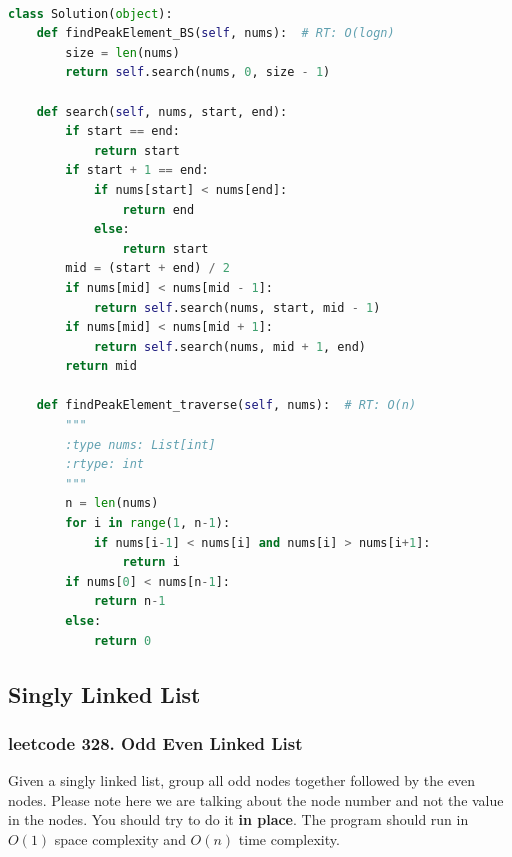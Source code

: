 \documentclass[a4paper,10pt]{article}
\begin{document}
\begin{lstlisting}[language=Python, caption=Problem162. Find Peak Element]

class Solution(object):
    def findPeakElement_BS(self, nums):  # RT: O(logn)
        size = len(nums)
        return self.search(nums, 0, size - 1)

    def search(self, nums, start, end):
        if start == end:
            return start
        if start + 1 == end:
            if nums[start] < nums[end]:
                return end
            else:
                return start
        mid = (start + end) / 2
        if nums[mid] < nums[mid - 1]:
            return self.search(nums, start, mid - 1)
        if nums[mid] < nums[mid + 1]:
            return self.search(nums, mid + 1, end)
        return mid

    def findPeakElement_traverse(self, nums):  # RT: O(n)
        """
        :type nums: List[int]
        :rtype: int
        """
        n = len(nums)
        for i in range(1, n-1):
            if nums[i-1] < nums[i] and nums[i] > nums[i+1]:
                return i
        if nums[0] < nums[n-1]:
            return n-1
        else:
            return 0
\end{lstlisting}































\subsection{Singly Linked List}

\subsubsection{leetcode 328. Odd Even Linked List}
Given a singly linked list, group all odd nodes together followed by the even nodes. Please note here we are talking about the node number and not the value in the nodes. You should try to do it \textbf{in place}. The program should run in $O(1)$ space complexity and $O(n)$ time complexity. \\
\end{document}
